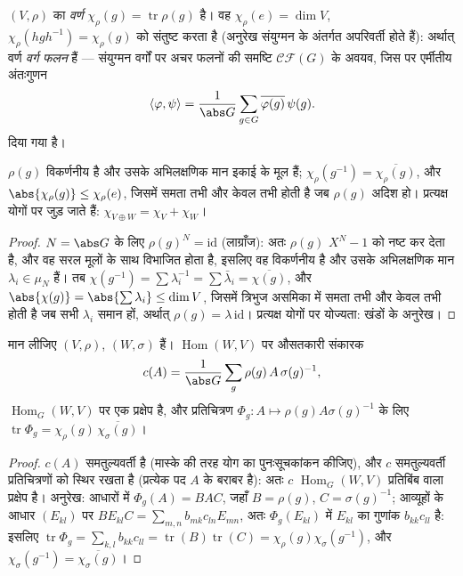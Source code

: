 \begin{definition}\label{def:b3:representations:character}
$(V, \rho)$ का \emph{वर्ण} $\chi_\rho(g) = \operatorname{tr}\rho(g)$ है। वह $\chi_\rho(e) = \dim V$, $\chi_\rho(hgh^{-1}) = \chi_\rho(g)$ को
संतुष्ट करता है (अनुरेख संयुग्मन के अंतर्गत अपरिवर्ती होते हैं):
अर्थात् वर्ण \emph{वर्ग फलन} हैं --- संयुग्मन
वर्गों पर अचर फलनों की समष्टि $\mathcal{CF}(G)$ के अवयव, जिस पर एर्मीतीय
अंतःगुणन
\[
\langle \varphi, \psi\rangle = \frac1{\abs G}\sum_{g \in G}
\overline{\varphi(g)}\,\psi(g).
\]
दिया गया है।
\end{definition}

\begin{proposition}\label{prop:b3:representations:charbasics}
$\rho(g)$ विकर्णनीय है और उसके अभिलक्षणिक मान इकाई के मूल हैं; $\chi_\rho(g^{-1}) = \overline{\chi_\rho(g)}$,
और $\abs{\chi_\rho(g)} \leq \chi_\rho(e)$, जिसमें समता तभी और केवल तभी होती है जब $\rho(g)$ अदिश हो।
प्रत्यक्ष योगों पर  जुड़ जाते हैं: $\chi_{V
\oplus W} = \chi_V + \chi_W$।
\end{proposition}

\begin{proof}
$N = \abs G$ के लिए $\rho(g)^N = \mathrm{id}$ (लाग्राँज): अतः $\rho(g)$ $X^N - 1$ को नष्ट कर देता
है, और वह सरल मूलों के साथ विभाजित होता है, इसलिए वह विकर्णनीय
है और उसके अभिलक्षणिक मान $\lambda_i \in \mu_N$ हैं। तब $\chi(g^{-1}) = \sum \lambda_i^{-1} = \sum\bar\lambda_i =
\overline{\chi(g)}$, और $\abs{\chi(g)} = \abs{\sum\lambda_i}
\leq \dim V$, जिसमें
त्रिभुज असमिका में समता तभी और केवल तभी होती है जब सभी $\lambda_i$
समान हों, अर्थात् $\rho(g) = \lambda\,\mathrm{id}$। प्रत्यक्ष योगों पर योज्यता: खंडों के
अनुरेख।
\end{proof}

\begin{lemma}\label{lem:b3:representations:homtrace}
मान लीजिए $(V, \rho)$, $(W, \sigma)$  हैं। $\operatorname{Hom}(W, V)$ पर औसतकारी संकारक
\[
c(A) = \frac1{\abs G}\sum_{g}\rho(g)\,A\,\sigma(g)^{-1},
\]
$\operatorname{Hom}_G(W, V)$ पर एक प्रक्षेप है, और प्रतिचित्रण $\Phi_g \colon A \mapsto \rho(g)A\sigma(g)^{-1}$ के लिए $\operatorname{tr}\Phi_g =
\chi_\rho(g)\,\overline{\chi_\sigma(g)}$।
\end{lemma}

\begin{proof}
$c(A)$ समतुल्यवर्ती है (मास्के की तरह योग का पुनःसूचकांकन कीजिए),
और $c$ समतुल्यवर्ती प्रतिचित्रणों को स्थिर रखता है (प्रत्येक पद
$A$ के बराबर है): अतः $c$ $\operatorname{Hom}_G(W, V)$ प्रतिबिंब वाला प्रक्षेप है।
अनुरेख: आधारों में $\Phi_g(A) = BAC$, जहाँ $B = \rho(g)$, $C = \sigma(g)^{-1}$; आव्यूहों के आधार
$(E_{kl})$ पर $BE_{kl}C = \sum_{m,n}
b_{mk}c_{ln}E_{mn}$, अतः $\Phi_g(E_{kl})$ में $E_{kl}$ का गुणांक $b_{kk}c_{ll}$ है: इसलिए
$\operatorname{tr}\Phi_g =
\sum_{k,l}b_{kk}c_{ll} = \operatorname{tr}(B)
\operatorname{tr}(C) = \chi_\rho(g)\chi_\sigma(g^{-1})$, और $\chi_\sigma(g^{-1}) = \overline{\chi_\sigma(g)}$।
\end{proof}

